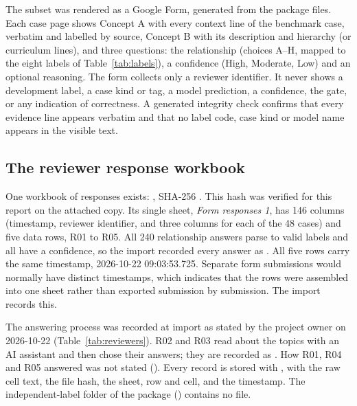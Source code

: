The subset was rendered as a Google Form, generated from the package files. Each case page shows Concept A with every context line of the benchmark case, verbatim and labelled by source, Concept B with its description and hierarchy (or curriculum lines), and three questions: the relationship (choices A--H, mapped to the eight labels of Table~\ref{tab:labels}), a confidence (High, Moderate, Low) and an optional reasoning. The form collects only a reviewer identifier. It never shows a development label, a case kind or tag, a model prediction, a confidence, the gate, or any indication of correctness. A generated integrity check confirms that every evidence line appears verbatim and that no label code, case kind or model name appears in the visible text.

\subsection{The reviewer response workbook}

One workbook of responses exists: , SHA-256 . This hash was verified for this report on the attached copy. Its single sheet, \emph{Form responses 1}, has 146 columns (timestamp, reviewer identifier, and three columns for each of the 48 cases) and five data rows, R01 to R05. All 240 relationship answers parse to valid labels and all have a confidence, so the import recorded every answer as . All five rows carry the same timestamp, 2026-10-22 09:03:53.725. Separate form submissions would normally have distinct timestamps, which indicates that the rows were assembled into one sheet rather than exported submission by submission. The import records this.

The answering process was recorded at import as stated by the project owner on 2026-10-22 (Table~\ref{tab:reviewers}). R02 and R03 read about the topics with an AI assistant and then chose their answers; they are recorded as . How R01, R04 and R05 answered was not stated (). Every record is stored with , with the raw cell text, the file hash, the sheet, row and cell, and the timestamp. The independent-label folder of the package () contains no file.

